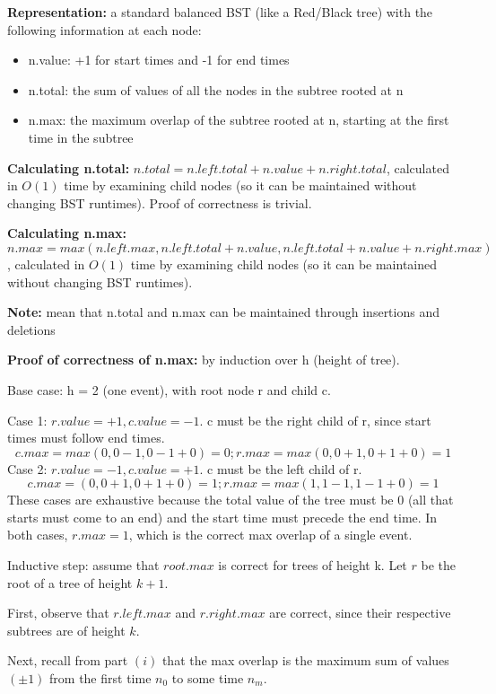 \documentclass{article}
\renewcommand{\b}[1]{\textbf{#1}}
\begin{document}
\begin{enumerate}[i.]
  \b{Representation:} a standard balanced BST (like a Red/Black tree) with the following information at each node:
  \begin{itemize}
    \item n.value: +1 for start times and -1 for end times 
    \item n.total: the sum of values of all the nodes in the subtree rooted at n
    \item n.max: the maximum overlap of the subtree rooted at n, starting at the first time in the subtree
  \end{itemize}
  
  \b{Calculating n.total:} $n.total = n.left.total + n.value + n.right.total$, calculated in $O(1)$ time by examining child nodes (so it can be maintained without changing BST runtimes). Proof of correctness is trivial.
  
  \b{Calculating n.max:} $n.max = max(n.left.max, n.left.total + n.value, n.left.total + n.value + n.right.max)$, calculated in $O(1)$ time by examining child nodes (so it can be maintained without changing BST runtimes).

  \b{Note:}  mean that n.total and n.max can be maintained through insertions and deletions

  \b{Proof of correctness of n.max:} by induction over h (height of tree).

  Base case: h = 2 (one event), with root node r and child c. 

  Case 1: $r.value = +1, c.value = -1$. c must be the right child of r, since start times must follow end times. 
  $$c.max = max(0, 0 - 1, 0 - 1 + 0) = 0; r.max = max(0, 0 + 1, 0 + 1 + 0) = 1$$
  Case 2: $r.value = -1, c.value = +1$. c must be the left child of r.
  $$c.max = (0, 0 + 1, 0 + 1 + 0) = 1; r.max = max(1, 1 - 1, 1 - 1 + 0) = 1$$
  These cases are exhaustive because the total value of the tree must be 0 (all that starts must come to an end) and the start time must precede the end time. In both cases, $r.max = 1$, which is the correct max overlap of a single event.

  Inductive step: assume that $root.max$ is correct for trees of height k. Let $r$ be the root of a tree of height $k+1$.

  First, observe that $r.left.max$ and $r.right.max$ are correct, since their respective subtrees are of height $k$. 

  Next, recall from part $(i)$ that the max overlap is the maximum sum of values $(\pm 1)$ from the first time $n_0$ to some time $n_m$.


\end{enumerate}
\end{document}
